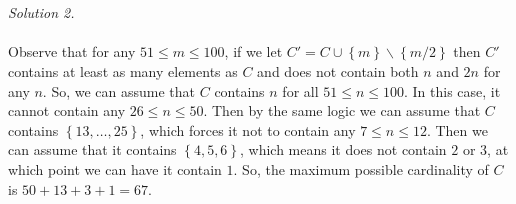 \begin{solution}
    \\\\
    \textit{Solution 2.}
    \\\\
    Observe that for any \( 51 \leq m \leq 100 \), if we let \( C' = C \cup \left\{m\right\} \backslash \left\{m/2\right\} \) then \( C' \) contains at least as many elements as \( C \) and does not contain both \( n \) and \( 2n \) for any \( n \). So, we can assume that \( C \) contains \( n \) for all \( 51 \leq n \leq 100 \). In this case, it cannot contain any \( 26 \leq n \leq 50 \). Then by the same logic we can assume that \( C \) contains \( \left\{13, \ldots, 25\right\} \), which forces it not to contain any \( 7 \leq n \leq 12 \). Then we can assume that it contains \( \left\{4, 5, 6\right\} \), which means it does not contain \( 2 \) or \( 3 \), at which point we can have it contain \( 1 \). So, the maximum possible cardinality of \( C \) is \( 50 + 13 + 3 + 1 = \boxed{67} \).
\end{solution}
